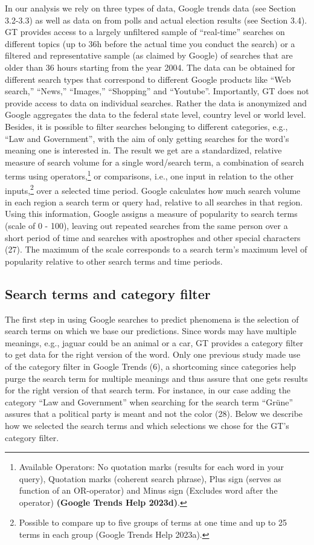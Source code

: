 \documentclass[
  letterpaper,
  DIV=11,
  numbers=noendperiod]{scrartcl}
\begin{document}
In our analysis we rely on three types of data, Google trends data (see
Section 3.2-3.3) as well as data on from polls and actual election
results (see Section 3.4). GT provides access to a largely unﬁltered
sample of ``real-time'' searches on different topics (up to 36h before
the actual time you conduct the search) or a ﬁltered and representative
sample (as claimed by Google) of searches that are older than 36 hours
starting from the year 2004. The data can be obtained for different
search types that correspond to diﬀerent Google products like ``Web
search,'' ``News,'' ``Images,'' ``Shopping'' and ``Youtube''.
Importantly, GT does not provide access to data on individual searches.
Rather the data is anonymized and Google aggregates the data to the
federal state level, country level or world level. Besides, it is
possible to filter searches belonging to different categories, e.g.,
``Law and Government'', with the aim of only getting searches for the
word's meaning one is interested in. The result we get are a
standardized, relative measure of search volume for a single word/search
term, a combination of search terms using operators,\footnote{Available
  Operators: No quotation marks (results for each word in your query),
  Quotation marks (coherent search phrase), Plus sign (serves as
  function of an OR-operator) and Minus sign (Excludes word after the
  operator) \textbf{(Google Trends Help 2023d)}.} or comparisons, i.e.,
one input in relation to the other inputs,\footnote{Possible to compare
  up to ﬁve groups of terms at one time and up to 25 terms in each group
  (Google Trends Help 2023a).} over a selected time period. Google
calculates how much search volume in each region a search term or query
had, relative to all searches in that region. Using this information,
Google assigns a measure of popularity to search terms (scale of 0 -
100), leaving out repeated searches from the same person over a short
period of time and searches with apostrophes and other special
characters (27). The maximum of the scale corresponds to a search term's
maximum level of popularity relative to other search terms and time
periods.

\hypertarget{search-terms-and-category-filter}{%
\subsection{Search terms and category
filter}\label{search-terms-and-category-filter}}

The first step in using Google searches to predict phenomena is the
selection of search terms on which we base our predictions. Since words
may have multiple meanings, e.g., jaguar could be an animal or a car, GT
provides a category filter to get data for the right version of the
word. Only one previous study made use of the category filter in Google
Trends (6), a shortcoming since categories help purge the search term
for multiple meanings and thus assure that one gets results for the
right version of that search term. For instance, in our case adding the
category ``Law and Government'' when searching for the search term
``Grüne'' assures that a political party is meant and not the color
(28). Below we describe how we selected the search terms and which
selections we chose for the GT's category filter.
\end{document}
